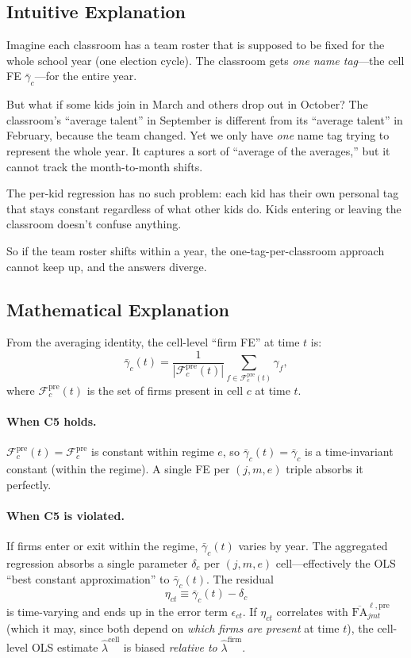 \documentclass{article}
\newcommand{\FA}{\mathrm{FA}}
\newcommand{\cFpre}{\mathcal{F}^{\mathrm{pre}}}
\theoremstyle{plain}
\theoremstyle{definition}
\begin{document}
\subsection{Intuitive Explanation}

Imagine each classroom has a team roster that is supposed to be fixed for the
whole school year (one election cycle).  The classroom gets \emph{one name
tag}---the cell FE $\bar\gamma_c$---for the entire year.

But what if some kids join in March and others drop out in October?  The
classroom's ``average talent'' in September is different from its ``average
talent'' in February, because the team changed.  Yet we only have \emph{one}
name tag trying to represent the whole year.  It captures a sort of
``average of the averages,'' but it cannot track the month-to-month shifts.

The per-kid regression has no such problem: each kid has their own personal tag
that stays constant regardless of what other kids do.  Kids entering or leaving
the classroom doesn't confuse anything.

So if the team roster shifts within a year, the one-tag-per-classroom approach
cannot keep up, and the answers diverge.

\subsection{Mathematical Explanation}

From the averaging identity, the cell-level ``firm FE'' at time $t$ is:
\[
  \bar\gamma_c(t)
  = \frac{1}{|\cFpre_c(t)|}\sum_{f \in \cFpre_c(t)} \gamma_f,
\]
where $\cFpre_c(t)$ is the set of firms present in cell $c$ at time $t$.

\paragraph{When C5 holds.}
$\cFpre_c(t) = \cFpre_c$ is constant within regime $e$, so
$\bar\gamma_c(t) = \bar\gamma_c$ is a time-invariant constant (within the
regime).  A single FE per $(j, m, e)$ triple absorbs it perfectly.

\paragraph{When C5 is violated.}
If firms enter or exit within the regime, $\bar\gamma_c(t)$ varies by year.
The aggregated regression absorbs a single parameter $\delta_c$ per $(j, m, e)$
cell---effectively the OLS ``best constant approximation'' to
$\bar\gamma_c(t)$.  The residual
\[
  \eta_{ct} \equiv \bar\gamma_c(t) - \delta_c
\]
is time-varying and ends up in the error term $\epsilon_{ct}$.  If $\eta_{ct}$
correlates with $\overline{\FA}^{\ell,\mathrm{pre}}_{jmt}$ (which it may,
since both depend on \emph{which firms are present} at time $t$), the cell-level
OLS estimate $\hat\lambda^\mathrm{cell}$ is biased \emph{relative to}
$\hat\lambda^\mathrm{firm}$.
\end{document}
